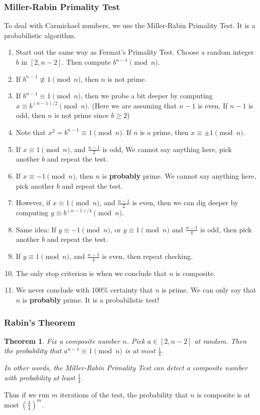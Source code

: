 \documentclass[letterpaper,12pt,oneside]{article}
\newtheorem{theorem}{Theorem}
\begin{document}
\subsubsection{Miller-Rabin Primality Test}
To deal with Carmichael numbers, we use the Miller-Rabin Primality Test. It is a probabilistic algorithm.\begin{enumerate}
    \item Start out the same way as Fermat's Primality Test. Choose a random integer $b$ in $[2,n-2]$. Then compute $b^{n-1}\pmod n$.
    \item If $b^{n-1}\not\equiv 1 \pmod n$, then $n$ is not prime.
    \item If $b^{n-1}\equiv 1 \pmod n$, then we probe a bit deeper by computing $x\equiv b^{(n-1)/2}\pmod n$. (Here we are assuming that $n-1$ is even. If $n-1$ is odd, then $n$ is not prime since $b\ge 2$)
    \item Note that $x^2=b^{n-1}\equiv 1 \pmod n$. If $n$ is a prime, then $x\equiv \pm 1 \pmod n$. 
    \item If $x\equiv 1 \pmod n$, and $\frac{n-1}{2}$ is odd, We cannot say anything here, pick another $b$ and repeat the test.
    \item If $x\equiv -1 \pmod n$, then $n$ is \textbf{probably} prime. We cannot say anything here, pick another $b$ and repeat the test.
    \item However, if $x\equiv 1 \pmod n$, and $\frac{n-1}{2}$ is even, then we can dig deeper by computing $y\equiv b^{(n-1)/4}\pmod n$.
    \item Same idea: If $y\equiv - 1 \pmod n$, or $y\equiv 1 \pmod n$ and $\frac{n-1}{4}$ is odd, then pick another $b$ and repeat the test.
    \item If $y\equiv 1 \pmod n$, and $\frac{n-1}{4}$ is even, then repeat checking. 
    \item The only stop criterion is when we conclude that $n$ is composite.
    \item We never conclude with 100\% certainty that $n$ is prime. We can only say that $n$ is \textbf{probably} prime. It is a probabilistic test!
\end{enumerate}
\subsubsection{Rabin's Theorem}
\begin{theorem}
    Fix a composite number $n$. Pick $a\in [2,n-2]$ at random. Then the probability that $a^{n-1}\equiv 1\pmod n$ is at most $\frac{1}{4}$.

    In other words, the Miller-Rabin Primality Test can detect a composite number with probability at least $\frac{1}{4}$.
\end{theorem}
Thus if we run $m$ iterations of the test, the probability that $n$ is composite is at most $(\frac{3}{4})^m$.
\end{document}
